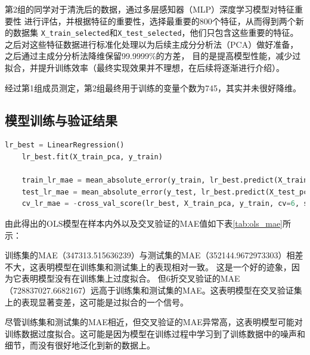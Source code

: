 \documentclass[
    report,     %
    oneside,    %
    UTF8,       %
    zihao=-4    %
]{config} %
\begin{document}
第2组的同学对于清洗后的数据，通过多层感知器（MLP）深度学习模型对特征重要性
进行评估，并根据特征的重要性，选择最重要的800个特征，从而得到两个新的数据集
\lstinline{X_train_selected}和\lstinline{X_test_selected}，他们只包含这些重要的特征。
之后对这些特征数据进行标准化处理以为后续主成分分析法（PCA）做好准备，之后通过主成分分析法降维保留99.9999\%的方差，
目的是提高模型性能，减少过拟合，并提升训练效率（最终实现效果并不理想，在后续将逐渐进行介绍）。

经过第1组成员测定，第2组最终用于训练的变量个数为745，其实并未很好降维。
\subsection{模型训练与验证结果}

\begin{lstlisting}[label=code:ols_model, language=Python, caption=OLS模型训练]
    lr_best = LinearRegression()
    lr_best.fit(X_train_pca, y_train)

    train_lr_mae = mean_absolute_error(y_train, lr_best.predict(X_train_pca))   
    test_lr_mae = mean_absolute_error(y_test, lr_best.predict(X_test_pca))
    cv_lr_mae = -cross_val_score(lr_best, X_train_pca, y_train, cv=6, scoring='neg_mean_absolute_error').mean()
\end{lstlisting}

由此得出的OLS模型在样本内外以及交叉验证的MAE值如下表\ref{tab:ols_mae}所示：

\begin{table}[htbp]
    \centering
    \caption{OLS模型在样本内外以及交叉验证的MAE值}
    \label{tab:ols_mae}
\end{table}

训练集的MAE（347313.515636239）与测试集的MAE（352144.9672973303）相差不大，这表明模型在训练集和测试集上的表现相对一致。
这是一个好的迹象，因为它表明模型没有在训练集上过度拟合。
但6折交叉验证的MAE（728837027.6682167）远高于训练集和测试集的MAE。这表明模型在交叉验证集上的表现显著变差，这可能是过拟合的一个信号。

尽管训练集和测试集的MAE相近，但交叉验证的MAE异常高，这表明模型可能对训练数据过度拟合。这可能是因为模型在训练过程中学习到了训练数据中的噪声和细节，而没有很好地泛化到新的数据上。
\end{document}
